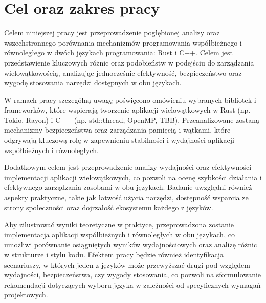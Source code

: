 \chapter{Cel oraz zakres pracy}
Celem niniejszej pracy jest przeprowadzenie pogłębionej analizy oraz wszechstronnego porównania mechanizmów programowania współbieżnego i równoległego w dwóch językach programowania: Rust i C++. Celem jest przedstawienie kluczowych różnic oraz podobieństw w podejściu do zarządzania wielowątkowością, analizując jednocześnie efektywność, bezpieczeństwo oraz wygodę stosowania narzędzi dostępnych w obu językach.

W ramach pracy szczególną uwagę poświęcono omówieniu wybranych bibliotek i frameworków, które wspierają tworzenie aplikacji wielowątkowych w Rust (np. Tokio, Rayon) i C++ (np. std::thread, OpenMP, TBB). Przeanalizowane zostaną mechanizmy bezpieczeństwa oraz zarządzania pamięcią i wątkami, które odgrywają kluczową rolę w zapewnieniu stabilności i wydajności aplikacji współbieżnych i równoległych.

Dodatkowym celem jest przeprowadzenie analizy wydajności oraz efektywności implementacji aplikacji wielowątkowych, co pozwoli na ocenę szybkości działania i efektywnego zarządzania zasobami w obu językach. Badanie uwzględni również aspekty praktyczne, takie jak łatwość użycia narzędzi, dostępność wsparcia ze strony społeczności oraz dojrzałość ekosystemu każdego z języków.

Aby zilustrować wyniki teoretyczne w praktyce, przeprowadzona zostanie implementacja aplikacji współbieżnych i równoległych w obu językach, co umożliwi porównanie osiągniętych wyników wydajnościowych oraz analizę różnic w strukturze i stylu kodu. Efektem pracy będzie również identyfikacja scenariuszy, w których jeden z języków może przewyższać drugi pod względem wydajności, bezpieczeństwa, czy wygody stosowania, co pozwoli na sformułowanie rekomendacji dotyczących wyboru języka w zależności od specyficznych wymagań projektowych.